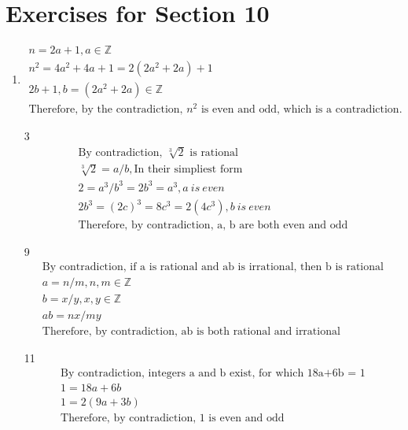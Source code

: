 \documentclass[12pt]{article}
\begin{document}
\section*{Exercises for Section 10}
\begin{enumerate}
	\item 
	    \begin{equation*}
	    	\begin{split}
		    n = 2a + 1, a \in \mathbb{Z}\\
		    n^2 = 4a^2 + 4a + 1 = 2(2a^2 + 2a) + 1\\
		    2b + 1, b = (2a^2 + 2a) \in \mathbb{Z}\\
		    \text{Therefore, by the contradiction, $n^2$ is even and odd, which is a contradiction.}
	    	\end{split}
	    \end{equation*}
	\item [3]
	    \begin{equation*}
	    	\begin{split}
		    \text{By contradiction, $\sqrt[3]{2}$ is rational}\\
		    \sqrt[3]{2} = a/b, \text{In their simpliest form}\\
		    2 = a^3/b^3 = 2b^3 = a^3, a \ is \ even\\
		    2b^3 = (2c)^3 = 8c^3 = 2(4c^3), b\ is \ even \\
		    \text{Therefore, by contradiction, a, b are both even and odd}
	    	\end{split}
	    \end{equation*}
	\item [9] 
	    \begin{equation*}
	    	\begin{split}
		    \text{By contradiction, if a is rational and ab is irrational, then b is rational}\\
		    a = n/m, n,m \in \mathbb{Z }\\
		    b = x/y, x,y \in \mathbb{Z }\\
		    ab = nx/my\\
		    \text{Therefore, by contradiction, ab is both rational and irrational}
	    	\end{split}
	    \end{equation*}
	\item [11] 
	    \begin{equation*}
	    	\begin{split}
		    \text{By contradiction, integers a and b exist, for which 18a+6b = 1}\\
		    1 = 18a + 6b\\
		    1 = 2(9a + 3b)\\
		    \text{Therefore, by contradiction, 1 is even and odd}
	    	\end{split}
	    \end{equation*}
\end{enumerate}
\end{document}
